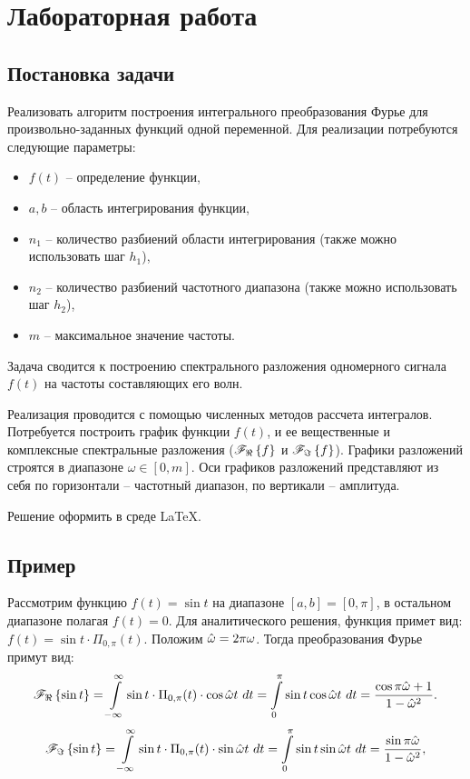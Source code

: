 \section{Лабораторная работа}

	\subsection{Постановка задачи}

		Реализовать алгоритм построения интегрального преобразования Фурье для произвольно-заданных функций одной переменной. Для реализации потребуются следующие параметры:
		\begin{itemize}

			\item \( f(t) \) -- определение функции,
			\item \( a, b \) -- область интегрирования функции,
			\item \( n_1 \) -- количество разбиений области интегрирования (также можно использовать шаг $h_1$),
			\item \( n_2 \) -- количество разбиений частотного диапазона (также можно использовать шаг $h_2$),
			\item \( m \) -- максимальное значение частоты.

		\end{itemize}

		Задача сводится к построению спектрального разложения одномерного сигнала $f(t)$ на частоты составляющих его волн.

		Реализация проводится с помощью численных методов рассчета интегралов. Потребуется построить график функции $f(t)$, и ее вещественные и комплексные спектральные разложения ($\mathscr{F}_{\Re} \left\lbrace {f} \right\rbrace$ и $\mathscr{F}_{\Im} \left\lbrace {f} \right\rbrace$). Графики разложений строятся в диапазоне $\omega \in [0, m]$. Оси графиков разложений представляют из себя по горизонтали -- частотный диапазон, по вертикали -- амплитуда. 

		Решение оформить в среде \LaTeX.

	\subsection{Пример}

		Рассмотрим функцию $f(t) = \sin{t}$ на диапазоне $[a, b] = [0, \pi]$, в остальном диапазоне полагая $f(t) = 0$. Для аналитического решения, функция примет вид: $f(t) = \sin{t} \cdot \Pi_{0, \pi}(t)$. Положим $\hat{\omega} = 2\pi \omega$.
		Тогда преобразования Фурье примут вид:
		\[ \mathscr{F}_{\Re} \left\lbrace {\sin{t}} \right\rbrace = \int\limits_{-\infty}^{\infty} \sin{t} \cdot \Pi_{0, \pi}(t) \cdot \cos{\hat{\omega}t} ~ dt = \int\limits_{0}^{\pi} \sin{t} \cos{\hat{\omega}t} ~ dt = \frac{\cos{\pi \hat{\omega}} + 1}{1 - \hat{\omega}^2}. \] 
		\[ \mathscr{F}_{\Im} \left\lbrace {\sin{t}} \right\rbrace = \int\limits_{-\infty}^{\infty} \sin{t} \cdot \Pi_{0, \pi}(t) \cdot \sin{\hat{\omega}t} ~ dt = \int\limits_{0}^{\pi} \sin{t} \sin{\hat{\omega}t} ~ dt = \frac{\sin{\pi \hat{\omega}}}{1 - \hat{\omega}^2}, \] 

